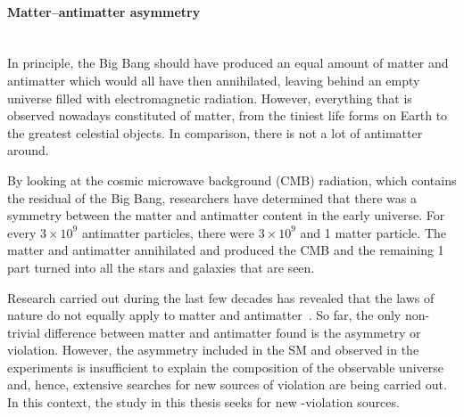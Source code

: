 \paragraph{Matter--antimatter asymmetry}\mbox{}\\
In principle, the Big Bang should have produced an equal amount of matter and antimatter 
which would all have then annihilated, leaving behind an empty universe filled with electromagnetic radiation.
 However, everything that is observed nowadays constituted of matter, from the tiniest life forms 
 on Earth to the greatest celestial objects. In comparison, there is not a lot of antimatter around. 

By looking at the cosmic microwave background (CMB) radiation, which contains the residual \Pgamma of the Big Bang, researchers 
have determined that there was a symmetry between the matter and antimatter content in the early universe. 
For every $3 \times 10^{9}$ antimatter particles, there were $3 \times 10^{9}$ and 1 matter particle.
The matter and antimatter annihilated and produced the CMB and the remaining 1 part turned into all the 
stars and galaxies that are seen.  %

Research carried out during the last few decades has revealed that the laws of nature do not equally apply to
matter and antimatter~\cite{Sakharov:1967dj}. So far, the only non-trivial difference between matter and 
antimatter found is the \CP asymmetry or \CP violation. 
However, the \CP asymmetry included in the SM and observed in the experiments is insufficient 
to explain the composition of the observable universe and, hence, extensive searches for new sources of \CP 
violation are being carried out.
In this context, the study in this thesis seeks for new \CP-violation sources. %






